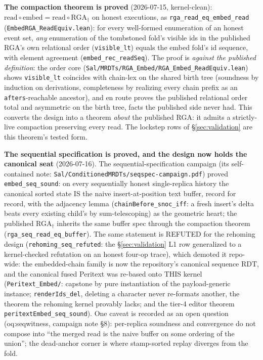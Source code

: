 \documentclass[11pt]{article}
\newcommand{\code}[1]{\texttt{#1}}
\begin{document}
\noindent\textbf{The compaction theorem is proved} (2026-07-15,
kernel-clean): $\mathrm{read} \circ \mathrm{embed} = \mathrm{read}
\circ \mathrm{RGA}_\dagger$ on honest executions, as
\code{rga\_read\_eq\_embed\_read}
(\code{EmbedRGA\_ReadEquiv.lean}): for every well-formed enumeration
of an honest event set, \emph{any} enumeration of the tombstoned
fold's visible ids in the published RGA's own relational order
(\code{visible\_lt}) equals the embed fold's id sequence, with
element agreement (\code{embed\_rec\_readSeq}). The proof is
\emph{against the published definition}: the order core
(\code{Sal/MRDTs/RGA\_Embed/RGA\_Embed\_ReadEquiv.lean}) shows
\code{visible\_lt} coincides with chain-lex on the shared birth tree
(soundness by induction on derivations, completeness by realizing
every chain prefix as an \code{afters}-reachable ancestor), and en
route proves the published relational order total and asymmetric on
the birth tree, facts the published side never had. This converts
the design into a theorem \emph{about} the published RGA: it admits a
strictly-live compaction preserving every read. The lockstep rows of
\S\ref{sec:validation} are this theorem's tested form.

\medskip
\noindent\textbf{The sequential specification is proved, and the
design now holds the canonical seat} (2026-07-16). The
sequential-specification campaign (its self-contained note:
\code{Sal/ConditionedMRDTs/seqspec-campaign.pdf}) proved
\code{embed\_seq\_sound}: on every sequentially honest single-replica
history the canonical sorted state IS the naive insert-at-position
text buffer, record for record, with the adjacency lemma
(\code{chainBefore\_snoc\_iff}: a fresh insert's delta beats every
existing child's by sum-telescoping) as the geometric heart; the
published RGA$_\dagger$ inherits the same buffer spec through the
compaction theorem (\code{rga\_seq\_read\_eq\_buffer}). The same
statement is REFUTED for the rehoming design
(\code{rehoming\_seq\_refuted}: the \S\ref{sec:validation} L1 row
generalized to a kernel-checked refutation on an honest four-op
trace), which demoted it repo-wide: the embedded-chain family is now
the repository's canonical sequence RDT, and the canonical fused
Peritext was re-based onto THIS kernel
(\code{Peritext\_Embed/}: capstone by pure instantiation of the
payload-generic instance; \code{renderIds\_del}, deleting a character
never re-formats another, the theorem the rehoming kernel provably
lacks; and the tier-4 editor theorem
\code{peritextEmbed\_seq\_sound}). One caveat is recorded as an open
question (oq:seqwitness, campaign note \S8): per-replica soundness
and convergence do not compose into ``the merged read is the naive
buffer on some ordering of the union''; the dead-anchor corner is
where stamp-sorted replay diverges from the fold.
\end{document}
